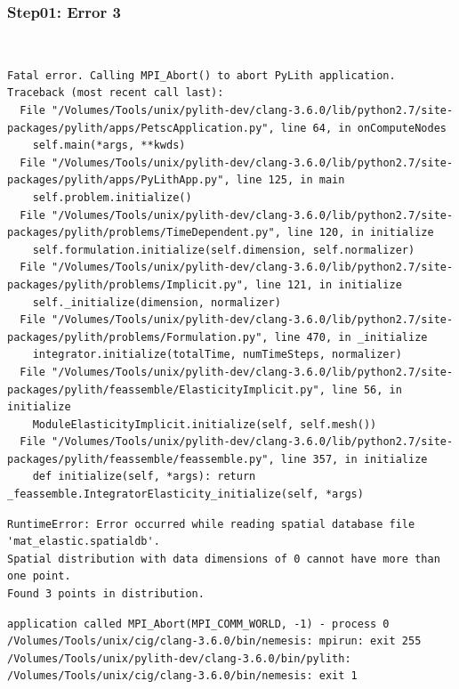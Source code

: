 \documentclass{beamer}
\begin{document}
\begin{frame}[fragile]
  \frametitle{Step01: Error 3}

\\
\begin{lstlisting}
Fatal error. Calling MPI_Abort() to abort PyLith application.
Traceback (most recent call last):
  File "/Volumes/Tools/unix/pylith-dev/clang-3.6.0/lib/python2.7/site-packages/pylith/apps/PetscApplication.py", line 64, in onComputeNodes
    self.main(*args, **kwds)
  File "/Volumes/Tools/unix/pylith-dev/clang-3.6.0/lib/python2.7/site-packages/pylith/apps/PyLithApp.py", line 125, in main
    self.problem.initialize()
  File "/Volumes/Tools/unix/pylith-dev/clang-3.6.0/lib/python2.7/site-packages/pylith/problems/TimeDependent.py", line 120, in initialize
    self.formulation.initialize(self.dimension, self.normalizer)
  File "/Volumes/Tools/unix/pylith-dev/clang-3.6.0/lib/python2.7/site-packages/pylith/problems/Implicit.py", line 121, in initialize
    self._initialize(dimension, normalizer)
  File "/Volumes/Tools/unix/pylith-dev/clang-3.6.0/lib/python2.7/site-packages/pylith/problems/Formulation.py", line 470, in _initialize
    integrator.initialize(totalTime, numTimeSteps, normalizer)
  File "/Volumes/Tools/unix/pylith-dev/clang-3.6.0/lib/python2.7/site-packages/pylith/feassemble/ElasticityImplicit.py", line 56, in initialize
    ModuleElasticityImplicit.initialize(self, self.mesh())
  File "/Volumes/Tools/unix/pylith-dev/clang-3.6.0/lib/python2.7/site-packages/pylith/feassemble/feassemble.py", line 357, in initialize
    def initialize(self, *args): return _feassemble.IntegratorElasticity_initialize(self, *args)
\end{lstlisting}
\begin{lstlisting}
RuntimeError: Error occurred while reading spatial database file 'mat_elastic.spatialdb'.
Spatial distribution with data dimensions of 0 cannot have more than one point.
Found 3 points in distribution.
\end{lstlisting}
\begin{lstlisting}
application called MPI_Abort(MPI_COMM_WORLD, -1) - process 0
/Volumes/Tools/unix/cig/clang-3.6.0/bin/nemesis: mpirun: exit 255
/Volumes/Tools/unix/pylith-dev/clang-3.6.0/bin/pylith: /Volumes/Tools/unix/cig/clang-3.6.0/bin/nemesis: exit 1
\end{lstlisting}
  
\end{frame}
\end{document}
